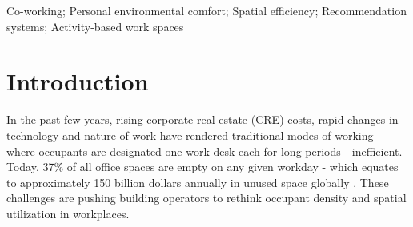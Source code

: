 \documentclass[]{interact}
\theoremstyle{plain}%
\theoremstyle{definition}
\theoremstyle{remark}
\begin{document}
\begin{abstract}

\end{abstract}

\begin{keywords}
Co-working; Personal environmental comfort; Spatial efficiency; Recommendation systems; Activity-based work spaces
\end{keywords}




\section{Introduction}

In the past few years, rising corporate real estate (CRE) costs, rapid changes in technology and nature of work have rendered traditional modes of working---where occupants are designated one work desk each for long periods---inefficient. Today, 37\% of all office spaces are empty on any given workday \citep{jll} - which equates to approximately 150 billion dollars annually in unused space globally \citep{cbre}. These challenges are pushing building operators to rethink occupant density and spatial utilization in workplaces.  
\end{document}
